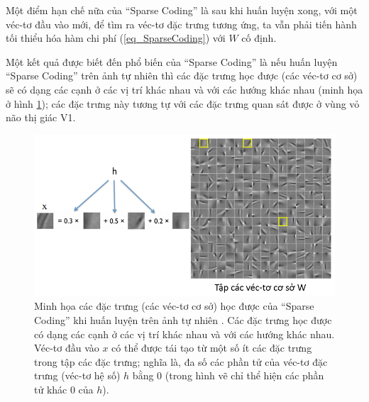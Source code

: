 Một điểm hạn chế nữa của ``Sparse Coding'' là sau khi huấn luyện xong, với một véc-tơ đầu vào mới, để tìm ra véc-tơ đặc trưng tương ứng, ta vẫn phải tiến hành tối thiểu hóa hàm chi phí (\ref{eq_SparseCoding}) với $W$ cố định.

Một kết quả được biết đến phổ biến của ``Sparse Coding'' là nếu huấn luyện ``Sparse Coding'' trên ảnh tự nhiên thì các đặc trưng học được (các véc-tơ cơ sở) sẽ có dạng các cạnh  ở các vị trí khác nhau và với các hướng khác nhau (minh họa ở hình \ref{fig_SparseCoding}); các đặc trưng này tương tự với các đặc trưng quan sát được ở vùng vỏ não thị giác V1. 

\begin{figure} 
	\centering
	\includegraphics[width=\textwidth]{SparseCoding}
	\caption[Minh họa các đặc trưng học được của ``Sparse Coding'' khi huấn luyện trên ảnh tự nhiên]{Minh họa các đặc trưng (các véc-tơ cơ sở) học được của ``Sparse Coding'' khi huấn luyện trên ảnh tự nhiên \cite{zeiler2014thesis}. Các đặc trưng học được có dạng các cạnh ở các vị trí khác nhau và với các hướng khác nhau. Véc-tơ đầu vào $x$ có thể được tái tạo từ một số ít các đặc trưng trong tập các đặc trưng; nghĩa là, đa số các phần tử của véc-tơ đặc trưng (véc-tơ hệ số) $h$ bằng 0 (trong hình vẽ chỉ thể hiện các phần tử khác 0 của $h$).}
	\label{fig_SparseCoding}
\end{figure}
